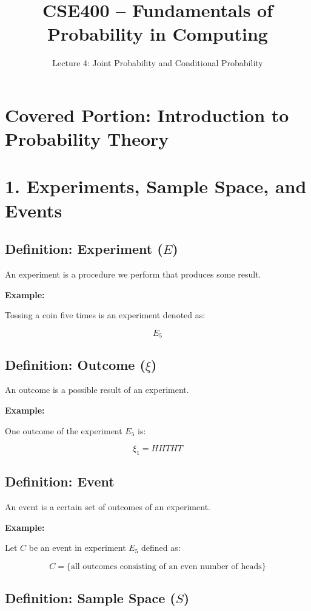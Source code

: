 \documentclass[12pt]{article}
\title{CSE400 – Fundamentals of Probability in Computing}
\author{Lecture 4: Joint Probability and Conditional Probability}
\date{}
\begin{document}
\maketitle

\section*{Covered Portion: Introduction to Probability Theory}

\section*{1. Experiments, Sample Space, and Events}

\subsection*{Definition: Experiment ($E$)}

An experiment is a procedure we perform that produces some result.

\textbf{Example:}

Tossing a coin five times is an experiment denoted as:

\[
E_5
\]

\subsection*{Definition: Outcome ($\xi$)}

An outcome is a possible result of an experiment.

\textbf{Example:}

One outcome of the experiment $E_5$ is:

\[
\xi_1 = HHTHT
\]

\subsection*{Definition: Event}

An event is a certain set of outcomes of an experiment.

\textbf{Example:}

Let $C$ be an event in experiment $E_5$ defined as:

\[
C = \{\text{all outcomes consisting of an even number of heads}\}
\]

\subsection*{Definition: Sample Space ($S$)}
\end{document}
